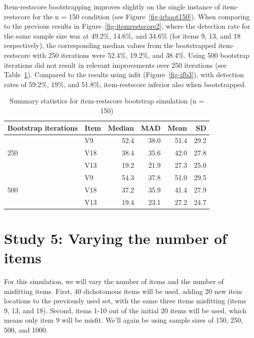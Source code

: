 \documentclass[
  letterpaper,
  DIV=11,
  numbers=noendperiod]{scrartcl}
\begin{document}
Item-restscore bootstrapping improves slightly on the single instance of
item-restscore for the n = 150 condition (see
Figure~\ref{fig-irboot150}). When comparing to the previous results in
Figure~\ref{fig-itemrestscore2}, where the detection rate for the same
sample size was at 49.2\%, 14.6\%, and 34.6\% (for items 9, 13, and 18
respectively), the corresponding median values from the bootstrapped
item-restscore with 250 iterations were 52.4\%, 19.2\%, and 38.4\%.
Using 500 bootstrap iterations did not result in relevant improvements
over 250 iterations (see Table~\ref{tbl-irb150mis}). Compared to the
results using infit (Figure~\ref{fig-ifb3}), with detection rates of
59.2\%, 19\%, and 51.8\%, item-restscore inferior also when
bootstrapped.

\begin{longtable}[]{@{}llrrrr@{}}

\caption{\label{tbl-irb150mis}Summary statistics for item-restscore
bootstrap simulation (n = 150)}

\tabularnewline

\toprule\noalign{}
Bootstrap iterations & Item & Median & MAD & Mean & SD \\
\midrule\noalign{}
\endhead
\bottomrule\noalign{}
\endlastfoot
& V9 & 52.4 & 38.0 & 51.4 & 29.2 \\
250 & V18 & 38.4 & 35.6 & 42.0 & 27.8 \\
& V13 & 19.2 & 21.9 & 27.3 & 25.0 \\
& V9 & 54.3 & 37.8 & 51.0 & 29.5 \\
500 & V18 & 37.2 & 35.9 & 41.4 & 27.9 \\
& V13 & 19.4 & 23.1 & 27.2 & 24.7 \\

\end{longtable}

\section{Study 5: Varying the number of
items}\label{study-5-varying-the-number-of-items}

For this simulation, we will vary the number of items and the number of
misfitting items. First, 40 dichotomous items will be used, adding 20
new item locations to the previously used set, with the same three items
misfitting (items 9, 13, and 18). Second, items 1-10 out of the initial
20 items will be used, which means only item 9 will be misfit. We'll
again be using sample sizes of 150, 250, 500, and 1000.
\end{document}
